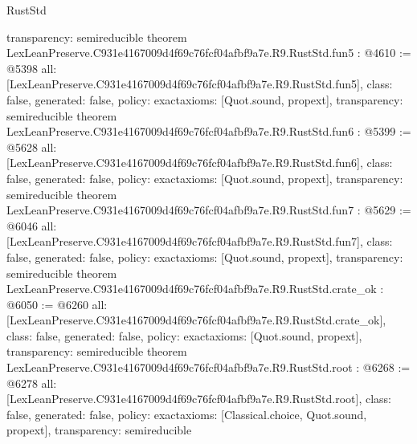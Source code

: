 \begin{lexlean}{RustStd}
\begin{coremodule}
{  transparency: semireducible
}
theorem LexLeanPreserve.C931e4167009d4f69c76fcf04afbf9a7e.R9.RustStd.fun5 : @4610 := @5398 {
  all: [LexLeanPreserve.C931e4167009d4f69c76fcf04afbf9a7e.R9.RustStd.fun5],
  class: false,
  generated: false,
  policy: exact{axioms: [Quot.sound, propext]},
  transparency: semireducible
}
theorem LexLeanPreserve.C931e4167009d4f69c76fcf04afbf9a7e.R9.RustStd.fun6 : @5399 := @5628 {
  all: [LexLeanPreserve.C931e4167009d4f69c76fcf04afbf9a7e.R9.RustStd.fun6],
  class: false,
  generated: false,
  policy: exact{axioms: [Quot.sound, propext]},
  transparency: semireducible
}
theorem LexLeanPreserve.C931e4167009d4f69c76fcf04afbf9a7e.R9.RustStd.fun7 : @5629 := @6046 {
  all: [LexLeanPreserve.C931e4167009d4f69c76fcf04afbf9a7e.R9.RustStd.fun7],
  class: false,
  generated: false,
  policy: exact{axioms: [Quot.sound, propext]},
  transparency: semireducible
}
theorem LexLeanPreserve.C931e4167009d4f69c76fcf04afbf9a7e.R9.RustStd.crate_ok : @6050 := @6260 {
  all: [LexLeanPreserve.C931e4167009d4f69c76fcf04afbf9a7e.R9.RustStd.crate_ok],
  class: false,
  generated: false,
  policy: exact{axioms: [Quot.sound, propext]},
  transparency: semireducible
}
theorem LexLeanPreserve.C931e4167009d4f69c76fcf04afbf9a7e.R9.RustStd.root : @6268 := @6278 {
  all: [LexLeanPreserve.C931e4167009d4f69c76fcf04afbf9a7e.R9.RustStd.root],
  class: false,
  generated: false,
  policy: exact{axioms: [Classical.choice, Quot.sound, propext]},
  transparency: semireducible
}


\end{coremodule}
\end{lexlean}
